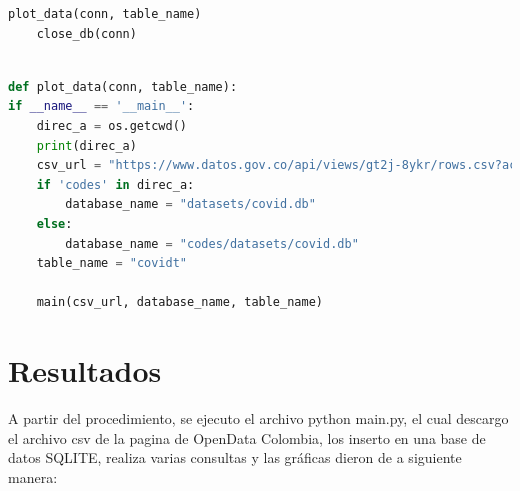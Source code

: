 \documentclass[conference,compsoc,onecolumn]{IEEEtran}
\begin{document}
\begin{itemize}
\begin{lstlisting}[language=python, caption=Funcion main del programa, captionpos=b, label=lst:SNRCode]
    plot_data(conn, table_name)
    close_db(conn)
      \end{lstlisting}
      
        \singlespacing 

        \begin{lstlisting}[language=python, caption=Datos iniciales de la url y archivo de la base de datos SQLITE, captionpos=b, label=lst:SNRCode]

def plot_data(conn, table_name):
if __name__ == '__main__':
    direc_a = os.getcwd()
    print(direc_a)
    csv_url = "https://www.datos.gov.co/api/views/gt2j-8ykr/rows.csv?accessType=DOWNLOAD"
    if 'codes' in direc_a:
        database_name = "datasets/covid.db"
    else:
        database_name = "codes/datasets/covid.db"
    table_name = "covidt"

    main(csv_url, database_name, table_name)
      \end{lstlisting}
\end{itemize}
       
       

\singlespacing
\singlespacing
\section{Resultados}
\label{sec:results}
A partir del procedimiento, se ejecuto el archivo python main.py, el cual descargo el archivo csv  de la pagina de OpenData Colombia, los inserto en una base de datos SQLITE, realiza varias consultas y las gráficas dieron de a siguiente manera:
 
\end{document}

